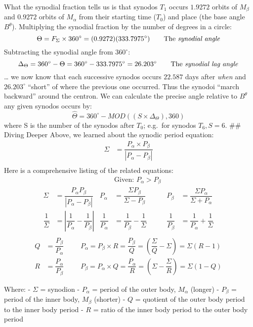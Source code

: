 \documentclass[
  letterpaper,
]{book}
\begin{document}
What the synodial fraction tells us is that synodos \(T_1\) occurs
\(1.9272\) orbits of \(M_\beta\) and \(0.9272\) orbits of \(M_\alpha\)
from their starting time (\(T_0\)) and place (the base angle
\(B^\theta\)). Multiplying the synodial fraction by the number of
degrees in a circle: \[
\Theta = F_\Sigma \times 360^\circ = (0.9272)(333.7975^\circ) \qquad \text{The \emph{synodial angle}}
\] Subtracting the synodial angle from \(360^\circ\): \[
\Delta_\Theta = 360^\circ - \Theta = 360^\circ - 333.7975^\circ = 26.203^\circ \qquad \text{The \emph{synodial lag angle}}
\] \ldots{} we now know that each successive synodos occurs \(22.587\)
days after \emph{when} and \(26.203^\circ\) ``short'' of where the
previous one occurred. Thus the synodoi ``march backward'' around the
centron. We can calculate the precise angle relative to \(B^\theta\) any
given synodos occurs by: \[
\widehat{\Theta} = 360^\circ - MOD((S \times \Delta_\Theta), 360)
\] where S is the number of the synodos after \(T_0\); e.g.~for synodos
\(T_6, S = 6\). \#\# Diving Deeper Above, we learned about the synodic
period equation: \[
\begin{align}
\Sigma &= \dfrac{P_\alpha \times P_\beta}{|P_\alpha - P_\beta|} \\
\end{align}
\] Here is a comprehensive listing of the related equations: \[
\begin{aligned}
&&& \text{Given: } P_\alpha > P_\beta \\[1em]
\Sigma &= \dfrac{P_\alpha P_\beta}{|P_\alpha - P_\beta|}
& P_\alpha &= \dfrac{\Sigma P_\beta}{\Sigma - P_\beta}
& P_\beta &= \dfrac{\Sigma P_\alpha}{\Sigma + P_\alpha} \\[1em]
\dfrac{1}{\Sigma} &= \left|\dfrac{1}{P_\alpha}-\dfrac{1}{P_\beta}\right|
& \dfrac{1}{P_\alpha} &= \dfrac{1}{P_\beta}-\dfrac{1}{\Sigma}
& \dfrac{1}{P_\beta} &= \dfrac{1}{P_\alpha}+\dfrac{1}{\Sigma} \\[1em]
\end{aligned}
\] \[
\begin{array}{rcl}
Q &= \dfrac{P_\beta}{P_\alpha} 
&&&P_\alpha = P_\beta \times R = \dfrac{P_\beta}{Q} 
= \left(\dfrac{\Sigma}{Q} - \Sigma\right) = \Sigma(R - 1) \\[1em]
R &= \dfrac{P_\alpha}{P_\beta} 
&&&P_\beta = P_\alpha \times Q = \dfrac{P_\alpha}{R}
= \left(\Sigma - \dfrac{\Sigma}{R}\right) = \Sigma(1-Q)
\end{array}
\]

Where: - \(\Sigma\) = synodion - \(P_\alpha\) = period of the outer
body, \(M_\alpha\) (longer) - \(P_\beta\) = period of the inner body,
\(M_\beta\) (shorter) - \(Q\) = quotient of the outer body period to the
inner body period - \(R\) = ratio of the inner body period to the outer
body period
\end{document}
